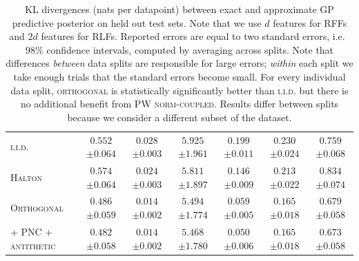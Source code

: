 \begin{table}[h!]
{\begin{tabular}{l c c c c c c}
\scshape{i.i.d.} & $0.552$ {\tiny $\pm 0.064$} & $0.028$ {\tiny $\pm 0.003$} & $5.925$ {\tiny $\pm 1.961$} & $0.199$ {\tiny $\pm 0.011$} & $0.230$ {\tiny $\pm 0.024$} & $0.759$ {\tiny $\pm 0.068$} \\
\scshape{Halton} & $0.574$ {\tiny $\pm 0.064$} & $0.024$ {\tiny $\pm 0.003$} & $5.811$ {\tiny $\pm 1.897$} & $0.146$ {\tiny $\pm 0.009$} & $0.213$ {\tiny $\pm 0.022$} & $0.834$ {\tiny $\pm 0.074$} \\
\scshape{Orthogonal} & $0.486$ {\tiny $\pm 0.059$} & $0.014$ {\tiny $\pm 0.002$} & $5.494$ {\tiny $\pm 1.774$} & $0.059$ {\tiny $\pm 0.005$} & $0.165$ {\tiny $\pm 0.018$} & $0.679$ {\tiny $\pm 0.058$} \\
\scshape{+ PNC + antithetic} & $0.482$ {\tiny $\pm 0.058$} & $0.014$ {\tiny $\pm 0.002$} & $5.468$ {\tiny $\pm 1.780$} & $0.050$ {\tiny $\pm 0.006$} & $0.165$ {\tiny $\pm 0.018$} & $0.673$ {\tiny $\pm 0.058$} \\
\bottomrule
\end{tabular}
}
\vspace{1mm}
\caption{
    KL divergences (nats per datapoint) between exact and approximate GP predictive posterior on held out test sets.
    Note that we use $d$ features for RFFs and $2d$ features for RLFs.
    Reported errors are equal to two standard errors, i.e.~$98\%$ confidence intervals, computed by averaging across splits.
    Note that differences \emph{between} data splits are responsible for large errors; \emph{within} each split we take enough trials that the standard errors become small.
    For every individual data split, {\scshape{orthogonal}} is statistically significantly better than {\scshape{i.i.d.}} but there is no additional benefit from {\scshape{PW norm-coupled}}. 
    Results differ between splits because we consider a different subset of the dataset.
}
\label{tab:kld}
\end{table}

